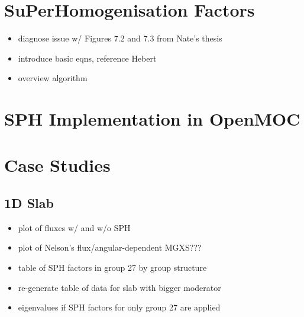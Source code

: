 \cite{hebert1993consistent}


\section{SuPerHomogenisation Factors}
\label{sec:chap5-sph}

\begin{itemize}
  \item diagnose issue w/ Figures 7.2 and 7.3 from Nate's thesis
  \item introduce basic eqns, reference Hebert
  \item overview algorithm
\end{itemize}


\section{SPH Implementation in OpenMOC}
\label{sec:chap5-sph-openmoc}


\section{Case Studies}
\label{sec:chap5-sph-results}

\subsection{1D Slab}
\label{subsubsec:chap5-sph-slab}

\begin{itemize}[noitemsep]
  \item plot of fluxes w/ and w/o SPH
  \item plot of Nelson's flux/angular-dependent MGXS???
  \item table of SPH factors in group 27 by group structure
  \item re-generate table of data for slab with bigger moderator
  \item eigenvalues if SPH factors for only group 27 are applied
\end{itemize}

